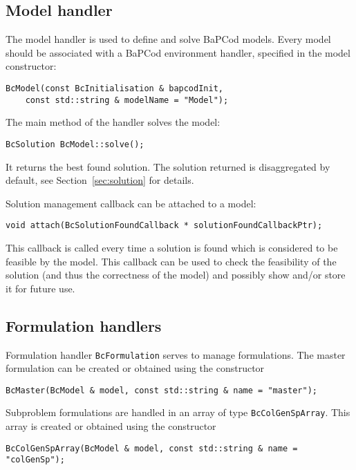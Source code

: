 \documentclass[10pt,a4paper]{article}
\newcommand{\bc}{BaPCod\xspace}
\begin{document}
\subsection{Model handler}
\label{sec:model}

The model handler is used to define and solve \bc models. Every model should be associated with a \bc environment handler,
specified in the model constructor:
\begin{lstlisting}
BcModel(const BcInitialisation & bapcodInit,
	const std::string & modelName = "Model");
\end{lstlisting}

The main method of the handler solves the model:
\begin{lstlisting}
BcSolution BcModel::solve(); 
\end{lstlisting}
It returns the best found solution. The solution returned is disaggregated by default, see Section~\ref{sec:solution}
for details.

Solution management callback can be attached to a model:
\begin{lstlisting}
void attach(BcSolutionFoundCallback * solutionFoundCallbackPtr);
\end{lstlisting}
This callback is called every time a solution is found which is considered to be feasible by the model. This callback
can be used to check the feasibility of the solution (and thus the correctness of the model) and possibly show and/or
store it for future use.

\subsection{Formulation handlers}
\label{sec:formulation}

Formulation handler \verb+BcFormulation+ serves to manage formulations. The master formulation can be created or
obtained using the constructor
\begin{lstlisting}
BcMaster(BcModel & model, const std::string & name = "master");
\end{lstlisting}

Subproblem formulations are handled in an array of type \verb+BcColGenSpArray+. This array is created or obtained using
the constructor
\begin{lstlisting}
BcColGenSpArray(BcModel & model, const std::string & name = "colGenSp");
\end{lstlisting}
\end{document}
